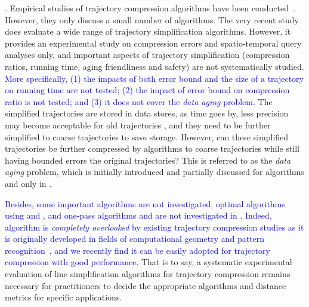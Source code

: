{. Empirical studies of trajectory compression algorithms have been conducted~\cite{Muckell:Compression,MuckellHLR10}. However, they only discuss a small number of algorithms. 
%
The very recent study \cite{Zhang:Evaluation} does evaluate a wide range of trajectory simplification algorithms.
However, it provides {an experimental study} on compression errors and spatio-temporal query analyses only, and important aspects of trajectory simplification (compression ratios, running time, aging friendliness and safety) are not systematically studied. 
\textcolor{blue}{More specifically, }
\textcolor{blue}{(1) the impacts of both error bound and the size of a trajectory on running time are not tested;}
%
\textcolor{blue}{(2) the impact of error bound on compression ratio is not tested; and }
%
\textcolor{blue}{(3) it does not cover the \emph{data aging} problem.} The simplified trajectories are stored in data stores, as time goes by, less precision may become acceptable for old trajectories \cite{Cao:Spatio}, and they need to be further simplified to coarse trajectories to save storage. However, can these simplified trajectories be further compressed by \lsa algorithms to coarse trajectories while still having bounded errors \wrt the original trajectories? This is referred to as the \emph{data aging} problem, which is initially introduced and partially discussed for algorithms \opt and \dpa only in \cite{Cao:Spatio}.

\textcolor{blue}{Besides, some important algorithms are not investigated, \eg optimal algorithms using \ped and \sed, and one-pass algorithms \siped and \cised are not investigated in \cite{Zhang:Evaluation}. Indeed, algorithm \siped is {\em completely overlooked} by existing trajectory compression studies as it is originally developed in fields of computational geometry and pattern recognition~\cite{Williams:Longest,Sklansky:Cone,Dunham:Cone, Zhao:Sleeve}, and we recently find it can be easily adopted for trajectory compression with good performance.} %
%
That is to say, a systematic experimental evaluation of line simplification algorithms for trajectory compression remains necessary for practitioners to decide the appropriate algorithms and distance metrics for specific applications.





}
